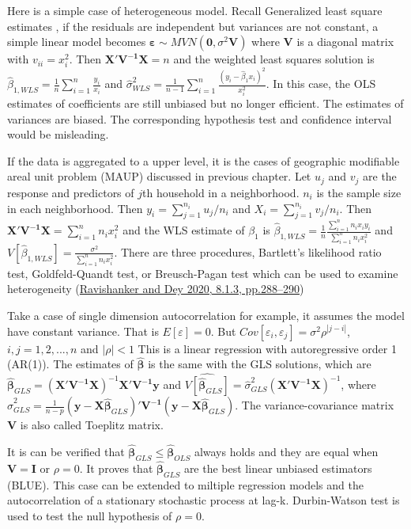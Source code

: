 \documentclass[
  11pt,
  openany]{memoir}
\begin{document}
Here is a simple case of heterogeneous model.
Recall Generalized least square estimates
, if the residuals are independent but variances are not constant, a simple linear model becomes \(\boldsymbol{\varepsilon}\sim MVN(\mathbf{0},\sigma^2\mathbf{V})\) where \(\mathbf{V}\) is a diagonal matrix with \(v_{ii}=x^2_i\).
Then \(\mathbf{X'V^{-1}X}=n\) and the weighted least squares solution is \(\hat\beta_{1,WLS}=\frac1n\sum_{i=1}^{n}\frac{y_i}{x_i}\) and \(\hat\sigma^2_{WLS}=\frac1{n-1}\sum_{i=1}^{n}\frac{(y_i-\hat\beta_{1}x_i)^2}{x_i^2}\).
In this case, the OLS estimates of coefficients are still unbiased but no longer efficient.
The estimates of variances are biased. The corresponding hypothesis test and confidence interval would be misleading.

If the data is aggregated to a upper level, it is the cases of geographic modifiable areal unit problem (MAUP) discussed in previous chapter.
Let \(u_j\) and \(v_j\) are the response and predictors of \(j\)th household in a neighborhood. \(n_i\) is the sample size in each neighborhood. Then \(y_i=\sum_{j=1}^{n_i}u_j/n_i\) and \(X_i=\sum_{j=1}^{n_i}v_j/n_i\).
Then \(\mathbf{X'V^{-1}X}=\sum_{i=1}^nn_ix_i^2\) and the WLS estimate of \(\beta_1\) is \(\hat\beta_{1,WLS}=\frac1n\frac{\sum_{i=1}^{n}n_ix_iy_i}{\sum_{i=1}^{n}n_ix_i^2}\) and \(V[\hat\beta_{1,WLS}]=\frac{\sigma^2}{\sum_{i=1}^{n}n_ix_i^2}\).
There are three procedures, Bartlett's likelihood ratio test, Goldfeld-Quandt test, or Breusch-Pagan test which can be used to examine heterogeneity (\protect\hyperlink{ref-ravishankerFirstCourseLinear2020}{Ravishanker and Dey 2020, 8.1.3, pp.288--290})

Take a case of single dimension autocorrelation for example, it assumes the model have constant variance. That is \(E[\varepsilon]=0\).
But \(Cov[\varepsilon_i,\varepsilon_j]=\sigma^2\rho^{|j-i|}\), \(i,j=1,2,...,n\) and \(|\rho|<1\)
This is a linear regression with autoregressive order 1 (AR(1)).
The estimates of \(\boldsymbol{\hat\beta}\) is the same with the GLS solutions, which are
\(\boldsymbol{\hat\beta}_{GLS}=(\mathbf{X'V^{-1}X})^{-1}\mathbf{X'V^{-1}}\mathbf{y}\) and
\(\widehat{V[\boldsymbol{\hat\beta}_{GLS}]}=\hat\sigma^2_{GLS}(\mathbf{X'V^{-1}X})^{-1}\),
where \(\hat\sigma^2_{GLS}=\frac1{n-p}(\mathbf{y-X}\boldsymbol{\hat\beta}_{GLS})'\mathbf{V^{-1}}(\mathbf{y-X}\boldsymbol{\hat\beta}_{GLS})\).
The variance-covariance matrix \(\mathbf{V}\) is also called Toeplitz matrix.

It is can be verified that \(\boldsymbol{\hat\beta}_{GLS}\le\boldsymbol{\hat\beta}_{OLS}\) always holds and they are equal when \(\mathbf{V=I}\) or \(\rho=0\). It proves that \(\boldsymbol{\hat\beta}_{GLS}\) are the best linear unbiased estimators (BLUE).
This case can be extended to miltiple regression models and the autocorrelation of a stationary stochastic process at lag-k.
Durbin-Watson test is used to test the null hypothesis of \(\rho=0\).
\end{document}
